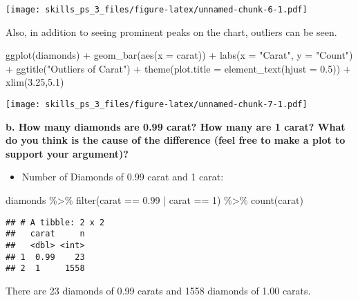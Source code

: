 \documentclass[
]{article}
\newenvironment{Shaded}{\begin{snugshade}}{\end{snugshade}}
\newcommand{\AttributeTok}[1]{\textcolor[rgb]{0.77,0.63,0.00}{#1}}
\newcommand{\DecValTok}[1]{\textcolor[rgb]{0.00,0.00,0.81}{#1}}
\newcommand{\FloatTok}[1]{\textcolor[rgb]{0.00,0.00,0.81}{#1}}
\newcommand{\FunctionTok}[1]{\textcolor[rgb]{0.00,0.00,0.00}{#1}}
\newcommand{\NormalTok}[1]{#1}
\newcommand{\SpecialCharTok}[1]{\textcolor[rgb]{0.00,0.00,0.00}{#1}}
\newcommand{\StringTok}[1]{\textcolor[rgb]{0.31,0.60,0.02}{#1}}
\providecommand{\tightlist}{%
  \setlength{\itemsep}{0pt}\setlength{\parskip}{0pt}}
\begin{document}
\texttt{[image: skills\_ps\_3\_files/figure-latex/unnamed-chunk-6-1.pdf]}

Also, in addition to seeing prominent peaks on the chart, outliers can
be seen.

\begin{Shaded}
\begin{Highlighting}[]
\FunctionTok{ggplot}\NormalTok{(diamonds) }\SpecialCharTok{+} 
  \FunctionTok{geom\_bar}\NormalTok{(}\FunctionTok{aes}\NormalTok{(}\AttributeTok{x =}\NormalTok{ carat)) }\SpecialCharTok{+}
  \FunctionTok{labs}\NormalTok{(}\AttributeTok{x =} \StringTok{"Carat"}\NormalTok{, }\AttributeTok{y =} \StringTok{"Count"}\NormalTok{) }\SpecialCharTok{+}
  \FunctionTok{ggtitle}\NormalTok{(}\StringTok{"Outliers of Carat"}\NormalTok{) }\SpecialCharTok{+}
  \FunctionTok{theme}\NormalTok{(}\AttributeTok{plot.title =} \FunctionTok{element\_text}\NormalTok{(}\AttributeTok{hjust =} \FloatTok{0.5}\NormalTok{)) }\SpecialCharTok{+}
  \FunctionTok{xlim}\NormalTok{(}\FloatTok{3.25}\NormalTok{,}\FloatTok{5.1}\NormalTok{)}
\end{Highlighting}
\end{Shaded}

\texttt{[image: skills\_ps\_3\_files/figure-latex/unnamed-chunk-7-1.pdf]}

\textbf{b. How many diamonds are 0.99 carat? How many are 1 carat? What
do you think is the cause of the difference (feel free to make a plot to
support your argument)?}

\begin{itemize}
\tightlist
\item
  Number of Diamonds of 0.99 carat and 1 carat:
\end{itemize}

\begin{Shaded}
\begin{Highlighting}[]
\NormalTok{diamonds }\SpecialCharTok{\%\textgreater{}\%}
  \FunctionTok{filter}\NormalTok{(carat }\SpecialCharTok{==} \FloatTok{0.99} \SpecialCharTok{|}\NormalTok{ carat }\SpecialCharTok{==} \DecValTok{1}\NormalTok{) }\SpecialCharTok{\%\textgreater{}\%}
  \FunctionTok{count}\NormalTok{(carat)}
\end{Highlighting}
\end{Shaded}

\begin{verbatim}
## # A tibble: 2 x 2
##   carat     n
##   <dbl> <int>
## 1  0.99    23
## 2  1     1558
\end{verbatim}

There are 23 diamonds of 0.99 carats and 1558 diamonds of 1.00 carats.
\end{document}
